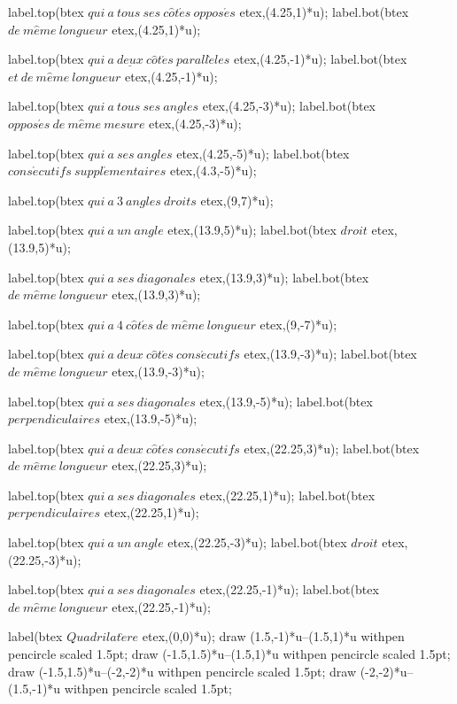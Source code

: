 \documentclass[12pt]{article}
\begin{document}
label.top(btex $ qui~a~tous~ses~c\hat{o}t\acute{e}s~oppos\acute{e}s $ etex,(4.25,1)*u);
label.bot(btex $ de~m\hat{e}me~longueur $ etex,(4.25,1)*u);

label.top(btex $ qui~a~\underline{deux}~c\hat{o}t\acute{e}s~parall\grave{e}les $ etex,(4.25,-1)*u);
label.bot(btex $ et~de~m\hat{e}me~longueur $ etex,(4.25,-1)*u);

label.top(btex $ qui~a~tous~ses~angles $ etex,(4.25,-3)*u);
label.bot(btex $ oppos\acute{e}s~de~m\hat{e}me~mesure $ etex,(4.25,-3)*u);

label.top(btex $ qui~a~ses~angles $ etex,(4.25,-5)*u);
label.bot(btex $ cons\acute{e}cutifs~suppl\acute{e}mentaires $ etex,(4.3,-5)*u);




label.top(btex $ qui~a~3~angles~droits $ etex,(9,7)*u);

label.top(btex $ qui~a~un~angle $ etex,(13.9,5)*u);
label.bot(btex $ droit $ etex,(13.9,5)*u);

label.top(btex $ qui~a~ses~diagonales $ etex,(13.9,3)*u);
label.bot(btex $ de~m\hat{e}me~longueur $ etex,(13.9,3)*u);




label.top(btex $ qui~a~4~c\hat{o}t\acute{e}s~de~m\hat{e}me~longueur $ etex,(9,-7)*u);


label.top(btex $ qui~a~deux~c\hat{o}t\acute{e}s~cons\acute{e}cutifs $ etex,(13.9,-3)*u);
label.bot(btex $ de~m\hat{e}me~longueur $ etex,(13.9,-3)*u);

label.top(btex $ qui~a~ses~diagonales $ etex,(13.9,-5)*u);
label.bot(btex $ perpendiculaires $ etex,(13.9,-5)*u);





label.top(btex $ qui~a~deux~c\hat{o}t\acute{e}s~cons\acute{e}cutifs $ etex,(22.25,3)*u);
label.bot(btex $ de~m\hat{e}me~longueur $ etex,(22.25,3)*u);

label.top(btex $ qui~a~ses~diagonales $ etex,(22.25,1)*u);
label.bot(btex $ perpendiculaires $ etex,(22.25,1)*u);


label.top(btex $ qui~a~un~angle $ etex,(22.25,-3)*u);
label.bot(btex $ droit $ etex,(22.25,-3)*u);

label.top(btex $ qui~a~ses~diagonales $ etex,(22.25,-1)*u);
label.bot(btex $ de~m\hat{e}me~longueur $ etex,(22.25,-1)*u);



label(btex $ Quadrilat\grave{e}re $ etex,(0,0)*u);
draw (1.5,-1)*u--(1.5,1)*u withpen pencircle scaled 1.5pt;
draw (-1.5,1.5)*u--(1.5,1)*u withpen pencircle scaled 1.5pt;
draw (-1.5,1.5)*u--(-2,-2)*u withpen pencircle scaled 1.5pt;
draw (-2,-2)*u--(1.5,-1)*u withpen pencircle scaled 1.5pt;
\end{document}
